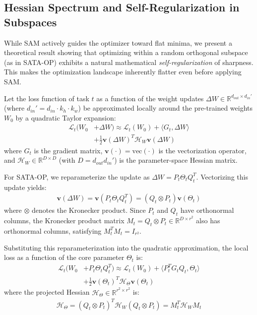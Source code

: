 \documentclass{article}
\theoremstyle{plain}
\theoremstyle{definition}
\theoremstyle{remark}
\begin{document}
\subsection{Hessian Spectrum and Self-Regularization in Subspaces}
While SAM actively guides the optimizer toward flat minima, we present a theoretical result showing that optimizing within a random orthogonal subspace (as in SATA-OP) exhibits a natural mathematical \textit{self-regularization} of sharpness. This makes the optimization landscape inherently flatter even before applying SAM.

Let the loss function of task $t$ as a function of the weight updates $\Delta W \in \mathbb{R}^{d_{out} \times d_{in}'}$ (where $d_{in}' = d_{in} \cdot k_h \cdot k_w$) be approximated locally around the pre-trained weights $W_0$ by a quadratic Taylor expansion:
\begin{align}
    \mathcal{L}_t(W_0 &+ \Delta W) \approx \mathcal{L}_t(W_0) + \langle G_t, \Delta W \rangle \nonumber \\
    &+ \frac{1}{2} \mathbf{v}(\Delta W)^T \mathcal{H}_W \mathbf{v}(\Delta W)
\end{align}
where $G_t$ is the gradient matrix, $\mathbf{v}(\cdot) = \text{vec}(\cdot)$ is the vectorization operator, and $\mathcal{H}_W \in \mathbb{R}^{D \times D}$ (with $D = d_{out} d_{in}'$) is the parameter-space Hessian matrix.

For SATA-OP, we reparameterize the update as $\Delta W = P_t \Theta_t Q_t^T$. Vectorizing this update yields:
\begin{align}
    \mathbf{v}(\Delta W) = \mathbf{v}(P_t \Theta_t Q_t^T) = (Q_t \otimes P_t) \mathbf{v}(\Theta_t)
\end{align}
where $\otimes$ denotes the Kronecker product. Since $P_t$ and $Q_t$ have orthonormal columns, the Kronecker product matrix $M_t = Q_t \otimes P_t \in \mathbb{R}^{D \times r^2}$ also has orthonormal columns, satisfying $M_t^T M_t = I_{r^2}$. 

Substituting this reparameterization into the quadratic approximation, the local loss as a function of the core parameter $\Theta_t$ is:
\begin{align}
    \mathcal{L}_t(W_0 &+ P_t \Theta_t Q_t^T) \approx \mathcal{L}_t(W_0) + \langle P_t^T G_t Q_t, \Theta_t \rangle \nonumber \\
    &+ \frac{1}{2} \mathbf{v}(\Theta_t)^T \mathcal{H}_{\Theta} \mathbf{v}(\Theta_t)
\end{align}
where the projected Hessian $\mathcal{H}_{\Theta} \in \mathbb{R}^{r^2 \times r^2}$ is:
\begin{align}
    \mathcal{H}_{\Theta} = (Q_t \otimes P_t)^T \mathcal{H}_W (Q_t \otimes P_t) = M_t^T \mathcal{H}_W M_t
\end{align}
\end{document}

